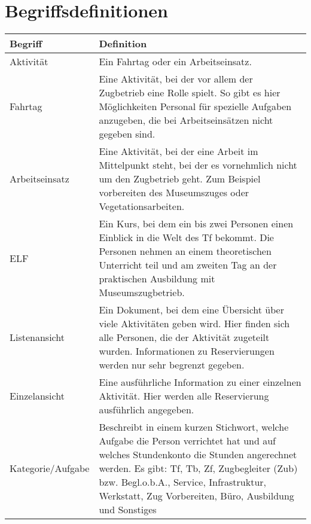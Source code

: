 \section{Begriffsdefinitionen}\label{glossar}
\begin{tabularx}{\textwidth}{l|X}
  Begriff	& Definition \\
  \hline
  \hline
  Aktivität &
    Ein Fahrtag oder ein Arbeitseinsatz. \\
  \hline
  Fahrtag	&
    Eine Aktivität, bei der vor allem der Zugbetrieb eine Rolle spielt.
    So gibt es hier Möglichkeiten Personal für spezielle Aufgaben anzugeben, die bei Arbeitseinsätzen nicht gegeben sind.\\
  \hline
  Arbeitseinsatz &
    Eine Aktivität, bei der eine Arbeit im Mittelpunkt steht, bei der es vornehmlich nicht um den Zugbetrieb geht.
    Zum Beispiel vorbereiten des Museumszuges oder Vegetationsarbeiten. \\
  \hline
  ELF &
    Ein Kurs, bei dem ein bis zwei Personen einen Einblick in die Welt des Tf bekommt.
    Die Personen nehmen an einem theoretischen Unterricht teil und am zweiten Tag an der praktischen Ausbildung mit Museumszugbetrieb.\\
  \hline
  Listenansicht &
    Ein Dokument, bei dem eine Übersicht über viele Aktivitäten geben wird.
    Hier finden sich alle Personen, die der Aktivität zugeteilt wurden.
    Informationen zu Reservierungen werden nur sehr begrenzt gegeben. \\
  \hline
  Einzelansicht &
  	Eine ausführliche Information zu einer einzelnen Aktivität.
    Hier werden alle Reservierung ausführlich angegeben. \\
  \hline
  Kategorie/Aufgabe &
  	Beschreibt in einem kurzen Stichwort, welche Aufgabe die Person verrichtet hat und auf welches Stundenkonto die Stunden angerechnet werden. \newline
    Es gibt: Tf, Tb, Zf, Zugbegleiter (Zub) bzw. Begl.o.b.A., Service, Infrastruktur, Werkstatt, Zug Vorbereiten, Büro, Ausbildung und Sonstiges
\end{tabularx}
